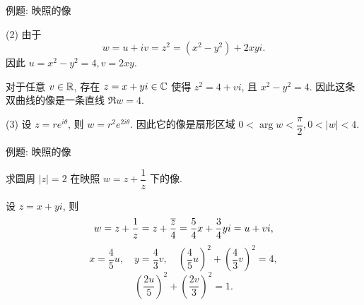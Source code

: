 \begin{frame}{例题: 映照的像}
\begin{solutionc}
(2) 由于
\[w=u+iv=z^2=(x^2-y^2)+2xyi.\]
\onslide<+->
因此 $u=x^2-y^2=4,v=2xy$.

\onslide<+->
\indent
对于任意 $v\in{\mathbb{R}}$, 存在 $z=x+yi\in{\mathbb{C}}$ 使得 $z^2=4+vi$, 且 $x^2-y^2=4$.
\onslide<+->
因此这条双曲线的像是一条直线 $\Re w=4$.
\vspace{\baselineskip}

(3) 设 $z=re^{i\theta}$, 则 $w=r^2e^{2i\theta}$.
\onslide<+->
因此它的像是扇形区域 $0<\arg w<\dfrac\pi2,0<|w|<4$.
\end{solutionc}
\end{frame}


\begin{frame}{例题: 映照的像}
\beqskip{7pt}
\begin{example}
求圆周 $|z|=2$ 在映照 $w=z+\dfrac1z$ 下的像.
\end{example}
\begin{solution}
设 $z=x+yi$, 则
\[w=z+\frac1z=z+\frac{\overline z}4=\frac54x+\frac34yi=u+vi,\]
\onslide<+->
\[x=\frac45u,\quad y=\frac43v,\quad \left(\frac45u\right)^2+\left(\frac43v\right)^2=4,\]
\onslide<+->
\[\left(\frac{2u}5\right)^2+\left(\frac{2v}3\right)^2=1.\]
\end{solution}
\endgroup
\end{frame}


